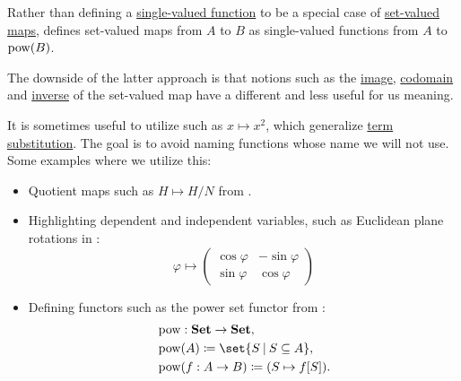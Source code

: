 \begin{remark}\label{rem:set_valued_map_as_single_valued}
  Rather than defining a \hyperref[def:function]{single-valued function} to be a special case of \hyperref[def:set_valued_map]{set-valued maps},  defines set-valued maps from \( A \) to \( B \) as single-valued functions from \( A \) to \( \operatorname{pow}(B) \).

  The downside of the latter approach is that notions such as the \hyperref[def:set_valued_map/image]{image}, \hyperref[def:set_valued_map/codomain]{codomain} and \hyperref[def:set_valued_map/inverse]{inverse} of the set-valued map have a different and less useful for us meaning.
\end{remark}

\begin{remark}\label{rem:implicit_function_notation}
  It is sometimes useful to utilize  such as \( x \mapsto x^2 \), which generalize \hyperref[def:first_order_substitution/term_in_term]{term substitution}. The goal is to avoid naming functions whose name we will not use. Some examples where we utilize this:
  \begin{itemize}
    \item Quotient maps such as \( H \mapsto H / N \) from .
    \item Highlighting dependent and independent variables, such as Euclidean plane rotations in :
    \begin{equation*}
      \varphi
      \mapsto
      \begin{pmatrix}
        \cos \varphi & -\sin \varphi \\
        \sin \varphi & \cos \varphi
      \end{pmatrix}
    \end{equation*}

    \item Defining functors such as the power set functor from :
    \begin{equation*}
      \begin{aligned}
        &\pow: \cat{Set} \to \cat{Set}, \\
        &\pow(A) \coloneqq \set{ S \given S \subseteq A }, \\
        &\pow(f: A \to B) \coloneqq (S \mapsto f[S]). \\
      \end{aligned}
    \end{equation*}
  \end{itemize}
\end{remark}

